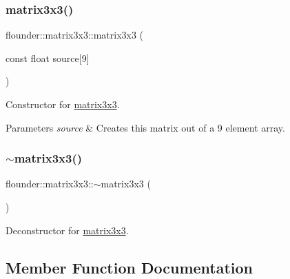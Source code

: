 \subsubsection{\texorpdfstring{matrix3x3()}{matrix3x3()}\hspace{0.1cm}{\footnotesize\ttfamily [3/3]}}
{\footnotesize\ttfamily flounder\+::matrix3x3\+::matrix3x3 (\begin{DoxyParamCaption}\item[{const float}]{source\mbox{[}9\mbox{]} }\end{DoxyParamCaption})}



Constructor for \hyperlink{classflounder_1_1matrix3x3}{matrix3x3}. 


\begin{DoxyParams}{Parameters}
{\em source} & Creates this matrix out of a 9 element array. \\
\hline
\end{DoxyParams}
\mbox{\label{classflounder_1_1matrix3x3_a9c59ba01efb971983a30a5d1f57b3f35}} 
\subsubsection{\texorpdfstring{$\sim$matrix3x3()}{~matrix3x3()}}
{\footnotesize\ttfamily flounder\+::matrix3x3\+::$\sim$matrix3x3 (\begin{DoxyParamCaption}{ }\end{DoxyParamCaption})}



Deconstructor for \hyperlink{classflounder_1_1matrix3x3}{matrix3x3}. 



\subsection{Member Function Documentation}
\mbox{\label{classflounder_1_1matrix3x3_af2284c32da51595e16e9802b9f398ac7}} 
